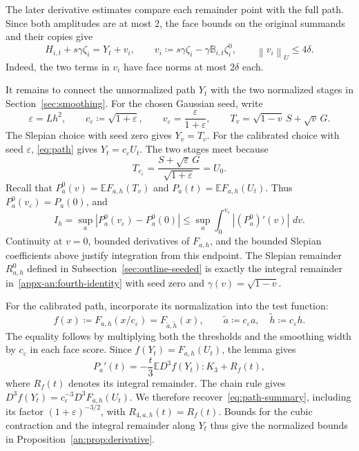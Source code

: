 \documentclass[11pt,letterpaper,twoside,leqno]{article}
\theoremstyle{bookplain}
\theoremstyle{bookremark}
\newcommand{\E}{\mathbb E}
\newcommand{\norm}[1]{\left\lVert#1\right\rVert}
\newcommand{\dd}{\,d}
\begin{document}
The later derivative estimates compare each remainder point with
the full path. Since both amplitudes are at most \(2\), the face
bounds on the original summands and their copies give
\begin{equation}
 H_{i,t}+s\gamma\zeta_i=Y_t+v_i,\qquad
 v_i\coloneqq s\gamma\zeta_i-\gamma\mathbb B_{i,t}\zeta_i^0,
 \qquad \norm{v_i}_U\le4\delta.
 \label{appx-an:translates}
\end{equation}
Indeed, the two terms in \(v_i\) have face norms at most
\(2\delta\) each.

It remains to connect the unnormalized path \(Y_t\) with the two
normalized stages in Section~\ref{sec:smoothing}. For the chosen
Gaussian seed, write
\begin{equation}
 \varepsilon=Lh^2,\qquad
 c_\varepsilon\coloneqq\sqrt{1+\varepsilon},\qquad
 v_\varepsilon=\frac{\varepsilon}{1+\varepsilon},
 \qquad T_v=\sqrt{1-v}\,S+\sqrt v\,G.
 \label{eq:seed-initialization}
\end{equation}
The Slepian choice with seed zero gives \(Y_v=T_v\). For the
calibrated choice with seed \(\varepsilon\),
\eqref{eq:path} gives \(Y_t=c_\varepsilon U_t\). The two stages
meet because
\[
 T_{v_\varepsilon}
 =\frac{S+\sqrt\varepsilon\,G}{\sqrt{1+\varepsilon}}
 =U_0.
\]
Recall that \(P_a^0(v)=\E F_{a,h}(T_v)\) and
\(P_a(t)=\E F_{a,h}(U_t)\). Thus
\(P_a^0(v_\varepsilon)=P_a(0)\), and
\[
 I_h=\sup_a|P_a^0(v_\varepsilon)-P_a^0(0)|
 \le\sup_a\int_0^{v_\varepsilon}|(P_a^0)'(v)|\,\dd v.
\]
Continuity at \(v=0\), bounded derivatives of \(F_{a,h}\), and the
bounded Slepian coefficients above justify integration from this
endpoint. The Slepian remainder \(R^0_{a,h}\) defined in
Subsection~\ref{sec:outline-seeded} is exactly the integral
remainder in~\eqref{appx-an:fourth-identity} with seed zero and
\(\gamma(v)=\sqrt{1-v}\).

For the calibrated path, incorporate its normalization into the
test function:
\begin{equation}
 f(x)\coloneqq F_{a,h}(x/c_\varepsilon)
       =F_{\widetilde a,\widetilde h}(x),\qquad
 \widetilde a\coloneqq c_\varepsilon a,\quad
 \widetilde h\coloneqq c_\varepsilon h.
 \label{eq:seeded-test}
\end{equation}
The equality follows by multiplying both the thresholds and the
smoothing width by \(c_\varepsilon\) in each face score. Since
\(f(Y_t)=F_{a,h}(U_t)\), the lemma gives
\[
 P_a'(t)=-\frac t3\E D^3f(Y_t):K_3+R_f(t),
\]
where \(R_f(t)\) denotes its integral remainder. The chain rule
gives \(D^3f(Y_t)=c_\varepsilon^{-3}D^3F_{a,h}(U_t)\).
We therefore recover~\eqref{eq:path-summary}, including its
factor \((1+\varepsilon)^{-3/2}\), with
\(R_{4,a,h}(t)=R_f(t)\). Bounds for the cubic contraction and the
integral remainder along \(Y_t\) thus give the normalized bounds
in Proposition~\ref{an:prop:derivative}.
\end{document}
